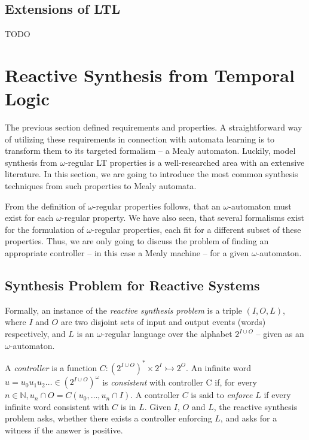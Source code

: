 \subsection{Extensions of LTL}

TODO

\section{Reactive Synthesis from Temporal Logic}

The previous section defined requirements and properties. A straightforward way of utilizing these requirements in connection with automata learning is to transform them to its targeted formalism -- a Mealy automaton. Luckily, model synthesis from $\omega$-regular LT properties is a well-researched area with an extensive literature. In this section, we are going to introduce the most common synthesis techniques from such properties to Mealy automata. 

From the definition of $\omega$-regular properties follows, that an $\omega$-automaton must exist for each $\omega$-regular property. We have also seen, that several formalisms exist for the formulation of $\omega$-regular properties, each fit for a different subset of these properties. Thus, we are only going to discuss the problem of finding an appropriate controller -- in this case a Mealy machine -- for a given $\omega$-automaton.  

\subsection{Synthesis Problem for Reactive Systems}
Formally, an instance of the \textit{reactive synthesis problem} is a triple $(I,O,L)$, where $I$ and $O$ are two disjoint sets of input and output events (words) respectively, and $L$ is an $\omega$-regular language over the alphabet $2^{I \cup O}$ -- given as an $\omega$-automaton. 

A \textit{controller} is a function $C : (2^{I \cup O})^* \times 2^I \rightarrowtail 2^O$. An infinite word $u = u_0 u_1 u_2 \dots \in (2^{I \cup O})^\omega$ is \textit{consistent} with controller C if, for every $n \in \mathbb{N}, u_n \cap O = C(u_0, \dots, u_n \cap I)$. A controller $C$ is said to \textit{enforce} $L$ if every infinite word consistent with $C$ is in $L$. Given $I$, $O$ and $L$, the reactive synthesis problem asks, whether there exists a controller enforcing $L$, and asks for a witness if the answer is positive. \cite{ltlsynt}

